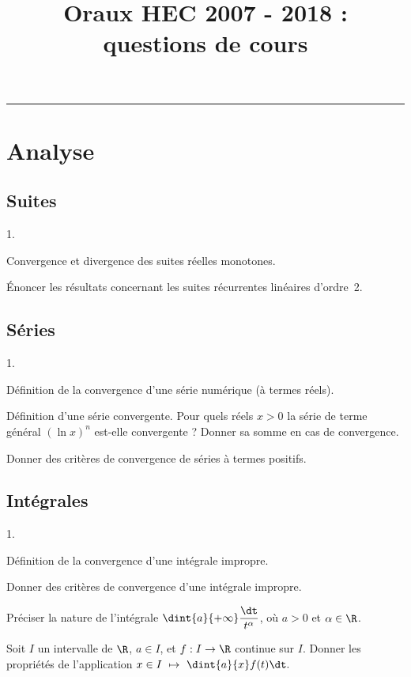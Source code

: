 \documentclass[11pt]{article}%
\title{\bf \vspace{- 2cm} Oraux HEC 2007 - 2018 :\\ questions de cours} %
\author{} %
\date{} %
\begin{document}
\maketitle %
\vspace{- 1.4cm}\hrule %
\thispagestyle{fancy}

\vspace*{.2cm}

\section*{Analyse}

\subsection*{Suites}

\begin{noliste}{1.}
\item Convergence et divergence des suites réelles monotones.
\item Énoncer les résultats concernant les suites récurrentes
  linéaires d'ordre~2.
\end{noliste}

\subsection*{Séries}

\begin{noliste}{1.}
\item Définition de la convergence d'une série numérique (à termes réels).
\item Définition d'une série convergente. Pour quels réels $x>0$ la
  série de terme général $(\ln x)^n$ est-elle convergente ? Donner sa
  somme en cas de convergence.
\item Donner des critères de convergence de séries à termes positifs.
\end{noliste}


\subsection*{Intégrales}

\begin{noliste}{1.}
\item Définition de la convergence d'une intégrale impropre.
\item Donner des critères de convergence d'une intégrale impropre.

  Préciser la nature de l'intégrale $\dint{a}{+\infty}
  \dfrac{\dt}{t^\alpha}$, où $a>0$ et $\alpha \in \R$.
\item Soit $I$ un intervalle de $\R$, $a\in I$, et $f:I\to \R$
  continue sur $I$. Donner les propriétés de l'application $x\in I \
  \mapsto \ \dint{a}{x} f(t)\dt.$
\end{noliste}
\end{document}
